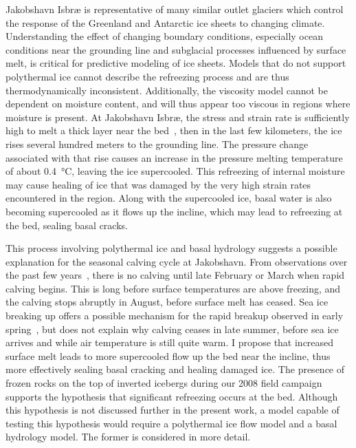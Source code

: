 Jakobshavn Isbr{\ae} is representative of many similar outlet glaciers which control the response of the Greenland and Antarctic ice sheets to changing climate.
Understanding the effect of changing boundary conditions, especially ocean conditions near the grounding line and subglacial processes influenced by surface melt, is critical for predictive modeling of ice sheets.
Models that do not support polythermal ice cannot describe the refreezing process and are thus thermodynamically inconsistent.
Additionally, the viscosity model cannot be dependent on moisture content, and will thus appear too viscous in regions where moisture is present.
At Jakobshavn Isbr{\ae}, the stress and strain rate is sufficiently high to melt a thick layer near the bed~\citep{funk1994mechanisms2}, then in the last few kilometers, the ice rises several hundred meters to the grounding line.
The pressure change associated with that rise causes an increase in the pressure melting temperature of about \SI{0.4}{\degreeCelsius}, leaving the ice supercooled.
This refreezing of internal moisture may cause healing of ice that was damaged by the very high strain rates encountered in the region.
Along with the supercooled ice, basal water is also becoming supercooled as it flows up the incline, which may lead to refreezing at the bed, sealing basal cracks.

This process involving polythermal ice and basal hydrology suggests a possible explanation for the seasonal calving cycle at Jakobshavn.
From observations over the past few years~\citep{joughin2008continued,amundson2008glacier}, there is no calving until late February or March when rapid calving begins.
This is long before surface temperatures are above freezing, and the calving stops abruptly in August, before surface melt has ceased.
Sea ice breaking up offers a possible mechanism for the rapid breakup observed in early spring~\citep{joughin2008continued,amundson2008glacier,amundson2010ice}, but does not explain why calving ceases in late summer, before sea ice arrives and while air temperature is still quite warm.
I propose that increased surface melt leads to more supercooled flow up the bed near the incline, thus more effectively sealing basal cracking and healing damaged ice.
The presence of frozen rocks on the top of inverted icebergs during our 2008 field campaign supports the hypothesis that significant refreezing occurs at the bed.
Although this hypothesis is not discussed further in the present work, a model capable of testing this hypothesis would require a polythermal ice flow model and a basal hydrology model.
The former is considered in more detail.


